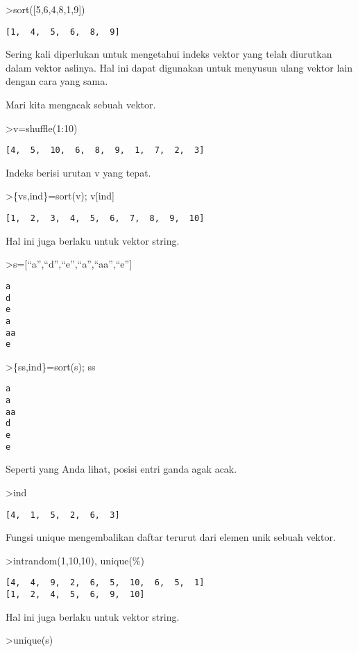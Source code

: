 \documentclass[
]{book}
\begin{document}
\textgreater sort({[}5,6,4,8,1,9{]})

\begin{verbatim}
[1,  4,  5,  6,  8,  9]
\end{verbatim}

Sering kali diperlukan untuk mengetahui indeks vektor yang telah diurutkan dalam vektor aslinya. Hal ini dapat digunakan untuk menyusun ulang vektor lain dengan cara yang sama.

Mari kita mengacak sebuah vektor.

\textgreater v=shuffle(1:10)

\begin{verbatim}
[4,  5,  10,  6,  8,  9,  1,  7,  2,  3]
\end{verbatim}

Indeks berisi urutan v yang tepat.

\textgreater\{vs,ind\}=sort(v); v{[}ind{]}

\begin{verbatim}
[1,  2,  3,  4,  5,  6,  7,  8,  9,  10]
\end{verbatim}

Hal ini juga berlaku untuk vektor string.

\textgreater s={[}``a'',``d'',``e'',``a'',``aa'',``e''{]}

\begin{verbatim}
a
d
e
a
aa
e
\end{verbatim}

\textgreater\{ss,ind\}=sort(s); ss

\begin{verbatim}
a
a
aa
d
e
e
\end{verbatim}

Seperti yang Anda lihat, posisi entri ganda agak acak.

\textgreater ind

\begin{verbatim}
[4,  1,  5,  2,  6,  3]
\end{verbatim}

Fungsi unique mengembalikan daftar terurut dari elemen unik sebuah vektor.

\textgreater intrandom(1,10,10), unique(\%)

\begin{verbatim}
[4,  4,  9,  2,  6,  5,  10,  6,  5,  1]
[1,  2,  4,  5,  6,  9,  10]
\end{verbatim}

Hal ini juga berlaku untuk vektor string.

\textgreater unique(s)
\end{document}
